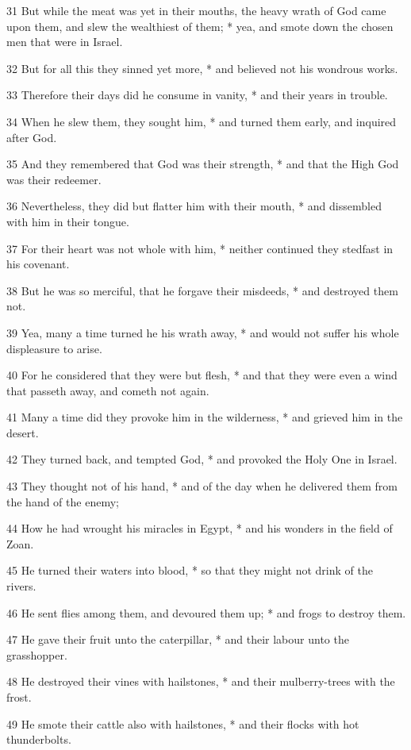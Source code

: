 31 But while the meat was yet in their mouths, the heavy wrath of God came upon them, and slew the wealthiest of them; * yea, and smote down the chosen men that were in Israel.\par
32 But for all this they sinned yet more, * and believed not his wondrous works.\par
33 Therefore their days did he consume in vanity, * and their years in trouble.\par
34 When he slew them, they sought him, * and turned them early, and inquired after God.\par
35 And they remembered that God was their strength, * and that the High God was their redeemer.\par
36 Nevertheless, they did but flatter him with their mouth, * and dissembled with him in their tongue.\par
37 For their heart was not whole with him, * neither continued they stedfast in his covenant.\par
38 But he was so merciful, that he forgave their misdeeds, * and destroyed them not.\par
39 Yea, many a time turned he his wrath away, * and would not suffer his whole displeasure to arise.\par
40 For he considered that they were but flesh, * and that they were even a wind that passeth away, and cometh not again.\par
41 Many a time did they provoke him in the wilderness, * and grieved him in the desert.\par
42 They turned back, and tempted God, * and provoked the Holy One in Israel.\par
43 They thought not of his hand, * and of the day when he delivered them from the hand of the enemy;\par
44 How he had wrought his miracles in Egypt, * and his wonders in the field of Zoan.\par
45 He turned their waters into blood, * so that they might not drink of the rivers.\par
46 He sent flies among them, and devoured them up; * and frogs to destroy them.\par
47 He gave their fruit unto the caterpillar, * and their labour unto the grasshopper.\par
48 He destroyed their vines with hailstones, * and their mulberry-trees with the frost.\par
49 He smote their cattle also with hailstones, * and their flocks with hot thunderbolts.\par
